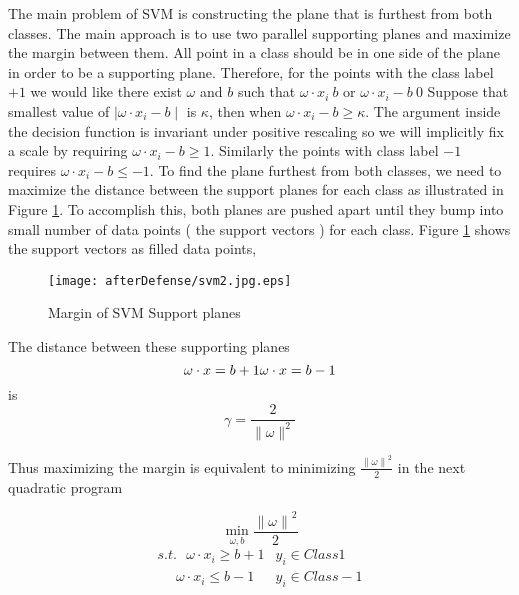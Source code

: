 The main problem of SVM is constructing the plane that is furthest from both classes. The main approach is to use two parallel supporting planes and maximize the margin between them. All point in a class should be in one side of the plane in order to be a supporting plane.  Therefore, for the points with the class label $+1$ we would like there exist $\omega$ and $b$ such that $\omega \cdot x_i\> b$ or $\omega \cdot x_i -b \> 0$%
Suppose that smallest value of $\mid \omega \cdot x_i -b\mid$ is $\kappa$, then when $ \omega \cdot x_i -b \geq \kappa$. The argument inside the decision function is invariant under positive rescaling so we will implicitly fix a scale by requiring $\omega \cdot x_i -b \geq 1 $. Similarly the points with class label $-1$ requires $\omega \cdot x_i -b \leq -1 $. To find the plane furthest from both classes, we need to maximize the distance between the support planes for each class as illustrated in Figure \ref{fig:svm2}. To accomplish this, both planes are pushed apart until they bump into small number of data points ( the support vectors ) for each class. Figure \ref{fig:svm2} shows the support vectors as filled data points, 
\begin{figure}
	\centering
		\texttt{[image: afterDefense/svm2.jpg.eps]}
	\caption{Margin of SVM Support planes }
	\label{fig:svm2}
\end{figure}


The distance between these supporting planes 
\begin{equation}
 \omega \cdot x=b+1 \\
  \omega \cdot x=b-1
\end{equation}
is 
\begin{equation}
 \gamma = \frac{2}{\parallel \omega \parallel^2}
\end{equation}

Thus maximizing the margin is equivalent to minimizing $\frac{{\parallel \omega \parallel}^2}{2}$ in the next quadratic program 

\begin{equation}
 \min_{\omega,b}  \frac{{\parallel \omega \parallel}^2}{2}
\end{equation}
\begin{equation}	
\begin{array}{cc}
 s.t. \ \ \   \omega \cdot x_i \geq b+1 &    y_i \in Class 1 \\ 
 \ \ \ \ \ \   \omega \cdot x_i \leq b-1 &    y_i \in Class -1 
  \end{array} 
\end{equation}

